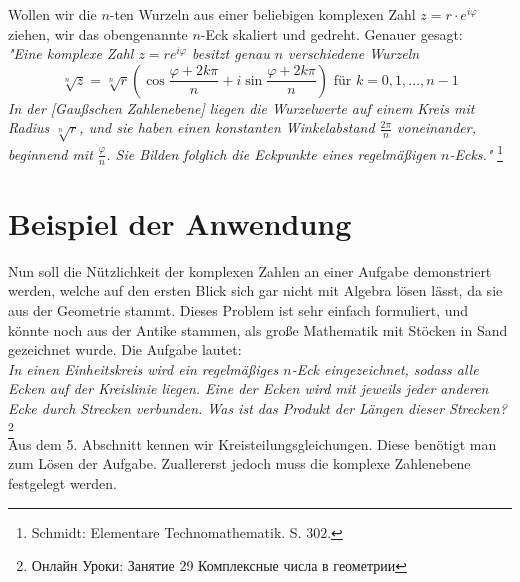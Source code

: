 \documentclass[a4paper,12pt]{article} %
\begin{document}
\begin{figure}[H]
	
\end{figure}


Wollen wir die $n$-ten Wurzeln aus einer beliebigen komplexen Zahl $z=r\cdot e^{i\varphi}$ ziehen, wir das obengenannte $n$-Eck skaliert und gedreht.
Genauer gesagt:\\

\noindent\emph{"{}Eine komplexe Zahl $z=r e^{i\varphi}$ besitzt genau $n$ verschiedene Wurzeln}
\begin{equation}\label{vieleck}
	\sqrt[n]{z}=\sqrt[n]{r}\left(\cos\frac{\varphi+2k\pi}{n}+i\sin\frac{\varphi+2k\pi}{n}\right) \textrm{ für } k=0, 1, \dots, n-1
\end{equation}
\emph{In der [Gaußschen Zahlenebene] liegen die Wurzelwerte auf einem Kreis mit Radius $\sqrt[n]{r}$, und sie haben einen konstanten Winkelabstand $\frac{2\pi}{n}$ voneinander, beginnend mit $\frac{\varphi}{n}$. Sie Bilden folglich die Eckpunkte eines regelmäßigen $n$-Ecks."} \footnote{Schmidt: Elementare Technomathematik. S. $302$.}











\section{Beispiel der Anwendung}

Nun soll die Nützlichkeit der komplexen Zahlen an einer Aufgabe demonstriert werden, welche auf den ersten Blick sich gar nicht mit Algebra lösen lässt, da sie aus der Geometrie stammt. Dieses Problem ist sehr einfach formuliert, und könnte noch aus der Antike stammen, als große Mathematik mit Stöcken in Sand gezeichnet wurde. Die Aufgabe lautet:\\

\noindent \textit{In einen Einheitskreis wird ein regelmäßiges $n$-Eck eingezeichnet, sodass alle Ecken auf der Kreislinie liegen.
Eine der Ecken wird mit jeweils jeder anderen Ecke durch Strecken verbunden.
Was ist das Produkt der Längen dieser Strecken?}\footnote{Онлайн Уроки: Занятие 29 Комплексные числа в геометрии}\\


Aus dem 5. Abschnitt kennen wir Kreisteilungsgleichungen. Diese benötigt man zum Lösen der Aufgabe. Zuallererst jedoch muss die komplexe Zahlenebene festgelegt werden. 
\end{document}
